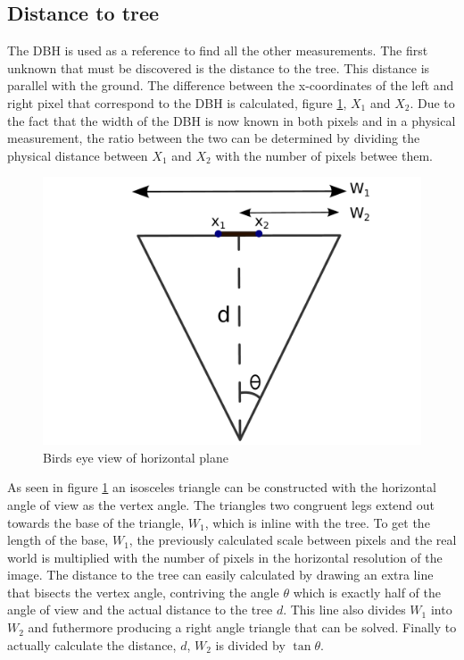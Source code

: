 \subsection{Distance to tree}
The DBH is used as a reference to find all the other measurements. The first unknown that must be discovered is the distance to the tree. This distance is parallel with the ground. The difference between the x-coordinates of the left and right pixel that correspond to the DBH is calculated, figure \ref{horizontal_triangle}, $X_1$ and $X_2$. Due to the fact that the width of the DBH is now known in both pixels and in a physical measurement, the ratio between the two can be determined by dividing the physical distance between $X_1$ and $X_2$ with the number of pixels betwee them.
\begin{figure}[htp]
\centering
{
	\includegraphics[scale=0.3]{horizontal_triangle.pdf}
	\caption{Birds eye view of horizontal plane}
	\label{horizontal_triangle}
}
\end{figure}
 As seen in figure \ref{horizontal_triangle} an isosceles triangle can be constructed with the horizontal angle of view as the vertex angle. The triangles two congruent legs extend out towards the base of the triangle, $W_1$, which is inline with the tree. To get the length of the base, $W_1$, the previously calculated scale between pixels and the real world is multiplied with the number of pixels in the horizontal resolution of the image. The distance to the tree can easily calculated by drawing an extra line that bisects the vertex angle, contriving the angle $\theta$ which is exactly half of the angle of view and the actual distance to the tree $d$. This line also divides $W_1$ into $W_2$ and futhermore producing a right angle triangle that can be solved. Finally to actually calculate the distance, $d$, $W_2$ is divided by $\tan{\theta}$.


